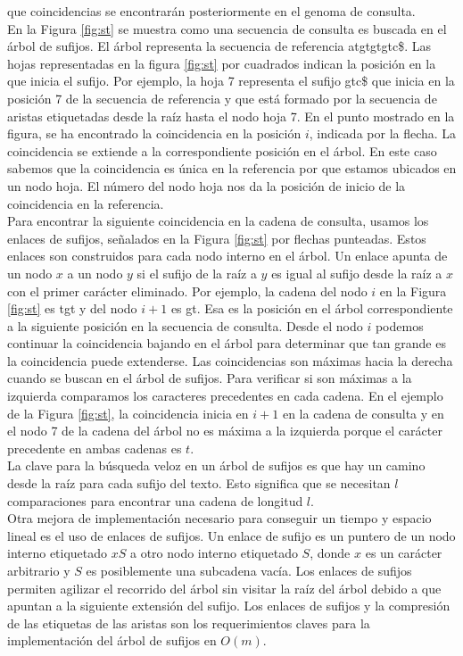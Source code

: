 \documentclass[12pt,a4paper]{article}
\begin{document}
que coincidencias se encontrarán posteriormente en el genoma de consulta.\\
\indent
En la Figura \ref{fig:st} se muestra como una secuencia de consulta es buscada en el árbol de sufijos. El
árbol representa la secuencia de referencia atgtgtgtc\$. Las hojas representadas en la figura \ref{fig:st} por cuadrados indican la
posición en la que inicia el sufijo. Por ejemplo, la hoja 7 representa el sufijo gtc\$ que inicia en la 
posición 7 de la secuencia de referencia y que está formado por la secuencia de aristas etiquetadas desde la
raíz hasta el nodo hoja 7. En el punto mostrado en la figura, se ha encontrado la coincidencia en la posición $i$,
indicada por la flecha. La coincidencia se extiende a la correspondiente posición en el árbol. En este caso sabemos
que la coincidencia es única en la referencia por que estamos ubicados en un nodo hoja. El número del nodo hoja
nos da la posición de inicio de la coincidencia en la referencia.\\
\indent
Para encontrar la siguiente coincidencia en la cadena de consulta, usamos los enlaces de sufijos, señalados en la Figura \ref{fig:st} por
flechas punteadas. Estos enlaces son construidos para cada nodo interno en el árbol. Un enlace apunta de un nodo
$x$ a un nodo $y$ si el sufijo de la raíz a $y$ es igual al sufijo desde la raíz a $x$ con el primer carácter 
eliminado. Por ejemplo, la cadena del nodo $i$ en la Figura \ref{fig:st} es tgt y del nodo $i+1$ es gt. Esa es la
posición en el árbol correspondiente a la siguiente posición en la secuencia de consulta. Desde el nodo $i$ podemos
continuar la coincidencia bajando en el árbol para determinar que tan grande es la coincidencia puede extenderse. Las 
coincidencias son máximas hacia la derecha cuando se buscan en el árbol de sufijos. Para verificar si son máximas a
la izquierda comparamos los caracteres precedentes en cada cadena. En el ejemplo de la Figura \ref{fig:st}, la
coincidencia inicia en $i+1$ en la cadena de consulta y en el nodo 7 de la cadena del árbol no es máxima a la izquierda
porque el carácter precedente en ambas cadenas es $t$.\\
\indent
La clave para la búsqueda veloz en un árbol de sufijos es que 
hay un camino desde la raíz para cada sufijo del texto. Esto significa que se 
necesitan $l$ comparaciones para encontrar una cadena de longitud $l$.\\
\indent
Otra mejora de implementación necesario para conseguir un tiempo y espacio 
lineal es el uso de enlaces de sufijos. Un enlace de sufijo es un puntero de un 
nodo interno etiquetado $xS$ a otro nodo interno etiquetado $S$, donde $x$ es un 
carácter arbitrario y $S$ es posiblemente una subcadena vacía. Los enlaces de 
sufijos permiten agilizar el recorrido del árbol sin visitar la raíz del árbol 
debido a que apuntan a la siguiente extensión del sufijo. Los enlaces de sufijos 
y la compresión de las etiquetas de las aristas son los requerimientos claves 
para la implementación del árbol de sufijos en $O(m)$.\\
\end{document}

